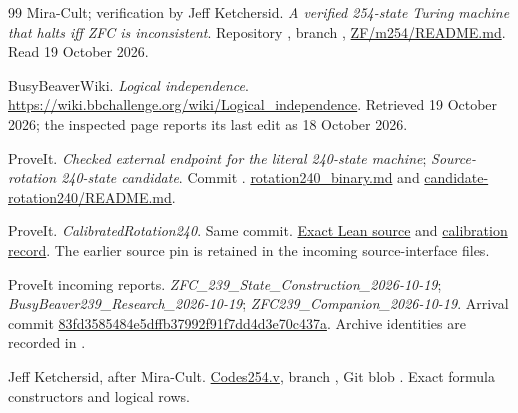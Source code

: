 \begin{thebibliography}{99}
\small
\setlength{\itemsep}{1pt}
\setlength{\parsep}{0pt}
\setlength{\parskip}{0pt}
Mira-Cult; verification by Jeff Ketchersid.
\emph{A verified 254-state Turing machine that halts iff ZFC is inconsistent}.
Repository , branch ,
\href{https://github.com/jeff87654/busy-beaver/blob/zf-254/ZF/m254/README.md}{ZF/m254/README.md}.
Read 19 October 2026.

BusyBeaverWiki. \emph{Logical independence}.
\url{https://wiki.bbchallenge.org/wiki/Logical_independence}.
Retrieved 19 October 2026; the inspected page reports its last
edit as 18 October 2026.

ProveIt. \emph{Checked external endpoint for the literal
240-state machine}; \emph{Source-rotation 240-state candidate}.
Commit .
\href{https://github.com/VladimirReshetnikov/ProveIt/blob/ce192939372ac7944fe2a0208c68a96d49fb5e3b/Computability/BusyBeaver/Research/ZFC/rotation240_binary.md}{rotation240\_binary.md}
and
\href{https://github.com/VladimirReshetnikov/ProveIt/blob/ce192939372ac7944fe2a0208c68a96d49fb5e3b/Computability/BusyBeaver/Research/ZFC/candidate-rotation240/README.md}{candidate-rotation240/README.md}.

ProveIt. \emph{CalibratedRotation240}.
Same commit.
\href{https://github.com/VladimirReshetnikov/ProveIt/blob/ce192939372ac7944fe2a0208c68a96d49fb5e3b/Computability/BusyBeaver/Lean/BusyBeaver/ZFC/CalibratedRotation240.lean}{Exact Lean source}
and
\href{https://github.com/VladimirReshetnikov/ProveIt/blob/ce192939372ac7944fe2a0208c68a96d49fb5e3b/Computability/BusyBeaver/Research/ZFC/calibrated_rotation240.md}{calibration record}.
The earlier source pin 
is retained in the incoming source-interface files.

ProveIt incoming reports.
\emph{ZFC\_239\_State\_Construction\_2026-10-19};
\emph{BusyBeaver239\_Research\_2026-10-19};
\emph{ZFC239\_Companion\_2026-10-19}.
Arrival commit
\href{https://github.com/VladimirReshetnikov/ProveIt/commit/83fd3585484e5dffb37992f91f7dd4d3e70c437a}{83fd3585484e5dffb37992f91f7dd4d3e70c437a}.
Archive identities are recorded in .

Jeff Ketchersid, after Mira-Cult.
\href{https://github.com/jeff87654/busy-beaver/blob/zf-254/ZF/m254/coq/logic/Codes254.v}{Codes254.v},
branch , Git blob
.
Exact formula constructors and logical rows.


\end{thebibliography}
